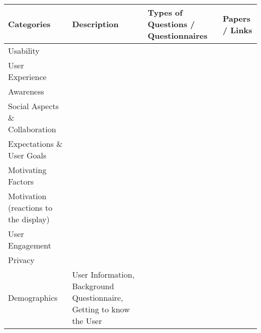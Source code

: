 \begin{table}[h]
\begin{tabular}{|p{4cm}|p{6cm}|p{3cm}|p{2cm}|}
\textbf{Categories}                   & \textbf{Description}                                                  & \textbf{Types of Questions / Questionnaires} & \textbf{Papers / Links} \\ \hline
Usability                             &                                                                       &                                              &                         \\ \hline
User Experience                       &                                                                       &                                              &                         \\ \hline
Awareness                             &                                                                       &                                              &                         \\ \hline
Social Aspects \& Collaboration       &                                                                       &                                              &                         \\ \hline
Expectations \& User Goals            &                                                                       &                                              &                         \\ \hline
Motivating Factors                    &                                                                       &                                              &                         \\ \hline
Motivation (reactions to the display) &                                                                       &                                              &                         \\ \hline
User Engagement                       &                                                                       &                                              &                         \\ \hline
Privacy                               &                                                                       &                                              &                         \\ \hline
Demographics                          & User Information, Background Questionnaire, Getting to know the User  &                                              &                         \\ \hline

\end{tabular}
\end{table}
